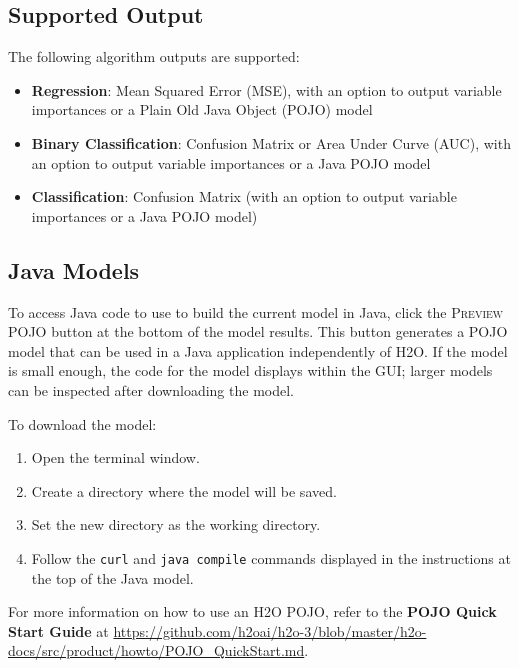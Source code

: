 \begin{minipage}{\textwidth}
\subsection{Supported Output}
The following algorithm outputs are supported:

\begin{itemize}
\item {\bf{Regression}}: Mean Squared Error (MSE), with an option to output variable importances or a Plain Old Java Object (POJO) model

\item {\bf{Binary Classification}}: Confusion Matrix or Area Under Curve (AUC), with an option to output variable importances or a Java POJO model

\item {\bf{Classification}}: Confusion Matrix (with an option to output variable importances or a Java POJO model)
\end{itemize}
\end{minipage}


\subsection{Java Models}

To access Java code to use to build the current model in Java, click the \textsc{Preview POJO} button at the bottom of the model results. This button generates a POJO model that can be used in a Java application independently of H2O. If the model is small enough, the code for the model displays within the GUI; larger models can be inspected after downloading the model.

To download the model:
\begin{enumerate}
\item Open the terminal window.
\item Create a directory where the model will be saved.
\item Set the new directory as the working directory.
\item Follow the \texttt{curl} and \texttt{java compile} commands displayed in the instructions at the top of the Java model.
\end{enumerate}

For more information on how to use an H2O POJO, refer to the \textbf{POJO Quick Start Guide} at {\url{https://github.com/h2oai/h2o-3/blob/master/h2o-docs/src/product/howto/POJO_QuickStart.md}}. 

